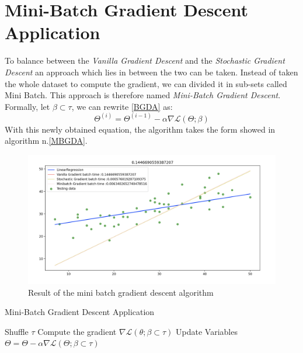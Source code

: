 \documentclass[conference]{IEEEtran}
\begin{document}
\section{Mini-Batch Gradient Descent Application}


To balance between the \textit{Vanilla Gradient Descent} and the  \textit{Stochastic Gradient Descent} an approach which lies in between the two can be taken. Instead of taken the whole dataset to compute the gradient, we can divided it in sub-sets called Mini Batch. This approach is therefore named \textit{Mini-Batch Gradient Descent}. \\
Formally, let $\beta \subset \tau$, we can rewrite \eqref{BGDA} as:
\begin{equation}
    \Theta^{(i)} = \Theta^{(i-1)} - \alpha\nabla\mathscr{L}(\Theta;\beta )\label{eq:MBGDA}
\end{equation}
With this newly obtained equation, the algorithm takes the form showed in algorithm n.\ref{MBGDA}.


\begin{figure}[htbp]
    \includegraphics[scale = 0.5]{Figures/Schermata 2021-05-11 alle 16.25.08.png}
    \caption{Result of the mini batch gradient descent algorithm}
    \label{fig:mini_res}
\end{figure}


\begin{algorithm}
\caption{Mini-Batch Gradient Descent Application}\label{MBGDA}
\begin{algorithmic}[1]
\State Shuffle $\tau$
\State Compute the gradient $\nabla\mathscr{L}(\theta;\beta \subset \tau)$
\State Update Variables $\Theta = \Theta -\alpha\nabla\mathscr{L}(\Theta;\beta \subset \tau)$
\EndFor
\EndFor
{}
\end{algorithmic}
\end{algorithm}
\end{document}
